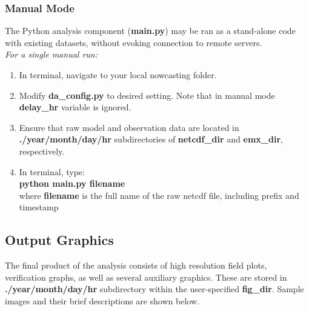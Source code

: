 \documentclass{article}
\begin{document}
\subsubsection{Manual Mode}
The Python analysis component (\textbf{main.py}) may be ran as a stand-alone code with existing datasets, without evoking connection to remote servers. \\

\noindent \emph{For a single manual run:} \\
\begin{enumerate}[1.]
\item In terminal, navigate to your local nowcasting folder. 
\item Modify \textbf{da\_config.py} to desired setting. Note that in manual mode \textbf{delay\_hr} variable is ignored. 
\item Ensure that raw model and observation data are located in \textbf{./year/month/day/hr} subdirectories of \textbf{netcdf\_dir} and \textbf{emx\_dir}, respectively.
\item In terminal, type: \\
\textbf{python main.py filename}\\
 where \textbf{filename} is the full name of the raw netcdf file, including prefix and timestamp
\end{enumerate}

\subsection{Output Graphics}
\FloatBarrier
The final product of the analysis consists of high resolution field plots, verification graphs, as well as several auxiliary graphics. These are stored in  \textbf{./year/month/day/hr} subdirectory within the user-specified \textbf{fig\_dir}. Sample images and their brief descriptions are shown below. 
\end{document}
